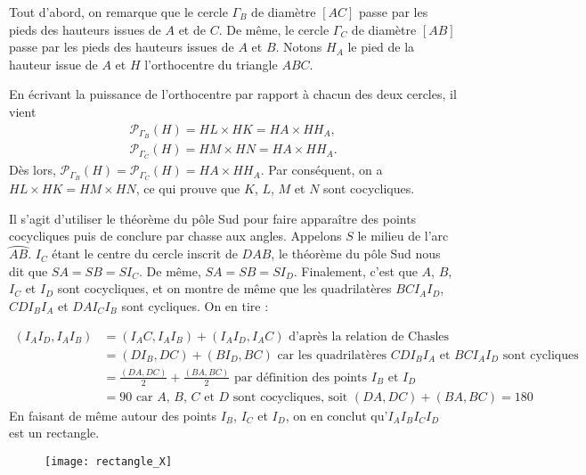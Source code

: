 \begin{sol}
Tout d'abord, on remarque que le cercle $\Gamma_B$ de diamètre $[AC]$ passe par les pieds des hauteurs issues de $A$ et de $C$. De même, le cercle $\Gamma_C$ de diamètre $[AB]$ passe par les pieds des hauteurs issues de $A$ et $B$. Notons $H_A$ le pied de la hauteur issue de $A$ et $H$ l'orthocentre du triangle $ABC$.

En écrivant la puissance de l'orthocentre par rapport à chacun des deux cercles, il vient
\begin{gather*}
    \mathcal{P}_{\Gamma_B}(H) = HL \times HK = HA \times HH_A,  \\
    \mathcal{P}_{\Gamma_C}(H) = HM \times HN = HA \times HH_A.
\end{gather*}
Dès lors, $\mathcal{P}_{\Gamma_B}(H) = \mathcal{P}_{\Gamma_C}(H) = HA \times HH_A$. Par conséquent, on a $HL \times HK = HM \times HN$, ce qui prouve que $K$, $L$, $M$ et $N$ sont cocycliques.
\end{sol}


\begin{sol}
Il s'agit d'utiliser le théorème du pôle Sud pour faire apparaître des points cocycliques puis de conclure par chasse aux angles. Appelons $S$ le milieu de l'arc $\wideparen{AB}$. $I_C$ étant le centre du cercle inscrit de $DAB$, le théorème du pôle Sud nous dit que $SA=SB=SI_C$. De même, $SA=SB=SI_D$. Finalement, c'est que $A$, $B$, $I_C$ et $I_D$ sont cocycliques, et on montre de même que les quadrilatères $BCI_AI_D$, $CDI_BI_A$ et $DAI_CI_B$ sont cycliques. On en tire :

\begin{align*}
(I_AI_D,I_AI_B)  &= (I_AC,I_AI_B)+(I_AI_D,I_AC) \text{\ \ d'après la relation de Chasles}\\
&= (DI_B,DC)+(BI_D,BC) \text{\ \ car les quadrilatères $CDI_BI_A$ et $BCI_AI_D$ sont cycliques}\\
&= \frac{(DA,DC)}{2}+\frac{(BA,BC)}{2} \text{\ \ par définition des points $I_B$ et $I_D$}\\
&= 90 \text{\ \ car $A$, $B$, $C$ et $D$ sont cocycliques, soit $(DA,DC)+(BA,BC)=180$}
\end{align*}
En faisant de même autour des points $I_B$, $I_C$ et $I_D$, on en conclut qu'$I_AI_BI_CI_D$ est un rectangle.

\begin{figure}[!h]
\centerline{\texttt{[image: rectangle\_X]}}
\end{figure}
\end{sol}


